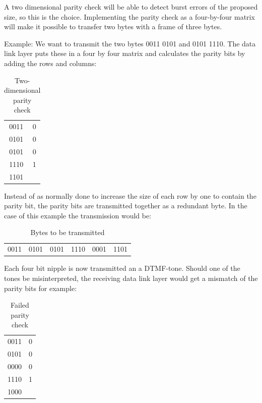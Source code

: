 \documentclass[letterpaper]{article}
\begin{document}
A two dimensional parity check will be able to detect burst errors of the
proposed size, so this is the choice. Implementing the parity check as a
four-by-four matrix will make it possible to transfer two bytes with a frame of
three bytes.

Example: We want to transmit the two bytes 0011 0101 and 0101 1110. The data
link layer puts these in a four by four matrix and calculates the parity bits by
adding the rows and columns:


\begin{table}[htb]
	\begin{center}
	\begin{tabular}{c|c}
	0011 & 0 \\
	0101 & 0 \\
	0101 & 0 \\
	1110 & 1 \\
	\hline
	1101 & \\
	\end{tabular}
	\end{center}
	\caption{Two-dimensional parity check}
	\label{tab:Two-dimensional parity check}
\end{table}

Instead of as normally done to increase the size of each row by one to contain
the parity bit, the parity bits are transmitted together as a redundant byte. In
the case of this example the transmission would be:

\begin{table}[htb]
	\begin{center}
	\begin{tabular}{c|c|c|c|c|c}
	0011 & 0101 & 0101 & 1110 & 0001 & 1101 \\
	\end{tabular}
	\end{center}
	\caption{Bytes to be transmitted}
	\label{tab:Bytes to be transmitted}
\end{table}

Each four bit nipple is now transmitted an a DTMF-tone. Should one of the tones
be misinterpreted, the receiving data link layer would get a mismatch of the
parity bits for example:

\begin{table}[htb]
	\begin{center}
	\begin{tabular}{c|c}
	0011 & 0 \\
	0101 & 0 \\
	0000 & 0 \\
	1110 & 1 \\
	\hline
	1000 & \\
	\end{tabular}
	\end{center}
	\caption{Failed parity check}
	\label{tab:Failed parity check}
\end{table}
\end{document}
